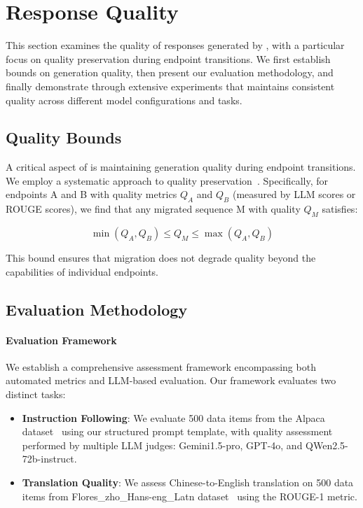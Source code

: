 \section{Response Quality}\label{appendix:accuracy-eval}

This section examines the quality of responses generated by \disco{}, with a particular focus on quality preservation during endpoint transitions. We first establish bounds on generation quality, then present our evaluation methodology, and finally demonstrate through extensive experiments that \disco{} maintains consistent quality across different model configurations and tasks.

\subsection{Quality Bounds}

A critical aspect of \disco{} is maintaining generation quality during endpoint transitions. We employ a systematic approach to quality preservation~\cite{diba2017weakly,gupta2022semi,chen2023frugalgpt}. Specifically, for endpoints A and B with quality metrics $Q_A$ and $Q_B$ (measured by LLM scores or ROUGE scores), we find that any migrated sequence M with quality $Q_M$ satisfies:

\begin{equation}
    \min(Q_A, Q_B) \leq Q_M \leq \max(Q_A, Q_B)
\end{equation}

This bound ensures that migration does not degrade quality beyond the capabilities of individual endpoints.

\subsection{Evaluation Methodology}

\paragraph{Evaluation Framework}
We establish a comprehensive assessment framework encompassing both automated metrics and LLM-based evaluation. Our framework evaluates two distinct tasks:

\begin{itemize}
    \item \textbf{Instruction Following}: We evaluate 500 data items from the Alpaca dataset~\cite{alpaca} using our structured prompt template, with quality assessment performed by multiple LLM judges: Gemini1.5-pro, GPT-4o, and QWen2.5-72b-instruct.
    
    \item \textbf{Translation Quality}: We assess Chinese-to-English translation on 500 data items from Flores\_zho\_Hans-eng\_Latn dataset~\cite{nllb2022,goyal2022flores} using the ROUGE-1 metric.
\end{itemize}

